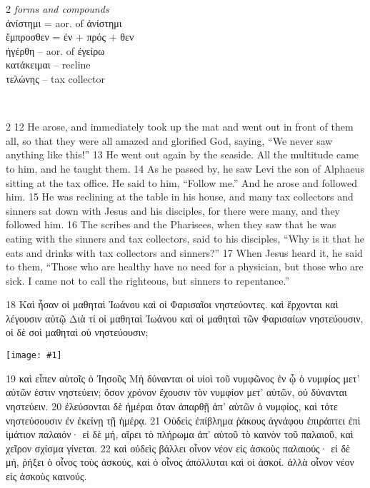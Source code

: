 \documentclass[10pt,a5paper,twoside,twocolumn]{book}
\newcommand{\fig}[1]{\texttt{[image: \#1]}\label{fig:#1}}
\newcommand*\cleartoleftpage{%
  \ifodd\value{page}\hbox{}\clearpage\fi
}
\newcommand{\separator}{\hspace{0.27\textwidth}\noindent\makebox[\linewidth]{\resizebox{0.3333\linewidth}{1pt}{$\bullet$}}\bigskip}
\newenvironment{facing}{\cleartoleftpage}{\clearpage\pagebreak}
\newenvironment{help}{\pagebreak}{}
\newenvironment{helpsec}{\begin{minipage}[t]{\textwidth}\begin{multicols}{2}}{\end{multicols}\end{minipage}}
\newenvironment{vocab}{\begin{helpsec}}{\end{helpsec}}
\newenvironment{translation}{\separator\\\begin{helpsec}\footnotesize}{\end{helpsec}}
\begin{document}
\begin{facing}
\begin{help}
\begin{vocab}
\emph{forms and compounds}\\
ἀνίστημι = aor. of ἀνίστημι\\
ἔμπροσθεν = ἐν + πρός + θεν \\
ἠγέρθη -- aor. of ἐγείρω\\
κατάκειμαι -- recline\\
τελώνης -- tax collector\\
\end{vocab}
\begin{translation}
 12 He arose, and immediately took up the mat and went out in front of them all, so that they were all amazed and glorified God, saying, ``We never saw anything like this!''
13 He went out again by the seaside. All the multitude came to him, and he taught them. 14 As he passed by, he saw Levi the son of Alphaeus sitting at the tax office. He said to him, ``Follow me.'' And he arose and followed him.
15 He was reclining at the table in his house, and many tax collectors and sinners sat down with Jesus and his disciples, for there were many, and they followed him. 16 The scribes and the Pharisees, when they saw that he was eating with the sinners and tax collectors, said to his disciples, ``Why is it that he eats and drinks with tax collectors and sinners?''
17 When Jesus heard it, he said to them, ``Those who are healthy have no need for a physician, but those who are sick. I came not to call the righteous, but sinners to repentance.'' 
\end{translation}
\end{help}
\end{facing}


18 Καὶ ἦσαν οἱ μαθηταὶ Ἰωάνου καὶ οἱ Φαρισαῖοι νηστεύοντες. καὶ ἔρχονται καὶ λέγουσιν αὐτῷ Διὰ τί οἱ μαθηταὶ Ἰωάνου καὶ οἱ μαθηταὶ τῶν Φαρισαίων νηστεύουσιν, οἱ δὲ σοὶ μαθηταὶ οὐ νηστεύουσιν; 

\fig{02-19} %

19 καὶ εἶπεν αὐτοῖς ὁ Ἰησοῦς Μὴ δύνανται οἱ υἱοὶ τοῦ νυμφῶνος ἐν ᾧ ὁ νυμφίος μετ’ αὐτῶν ἐστιν νηστεύειν; ὅσον χρόνον ἔχουσιν τὸν νυμφίον μετ’ αὐτῶν, οὐ δύνανται νηστεύειν. 20 ἐλεύσονται δὲ ἡμέραι ὅταν ἀπαρθῇ ἀπ’ αὐτῶν ὁ νυμφίος, καὶ τότε νηστεύσουσιν ἐν ἐκείνῃ τῇ ἡμέρᾳ. 21 Οὐδεὶς ἐπίβλημα ῥάκους ἀγνάφου ἐπιράπτει ἐπὶ ἱμάτιον παλαιόν· εἰ δὲ μή, αἴρει τὸ πλήρωμα ἀπ’ αὐτοῦ τὸ καινὸν τοῦ παλαιοῦ, καὶ χεῖρον σχίσμα γίνεται. 22 καὶ οὐδεὶς βάλλει οἶνον νέον εἰς ἀσκοὺς παλαιούς· εἰ δὲ μή, ῥήξει ὁ οἶνος τοὺς ἀσκούς, καὶ ὁ οἶνος ἀπόλλυται καὶ οἱ ἀσκοί. ἀλλὰ οἶνον νέον εἰς ἀσκοὺς καινούς.
\end{document}

